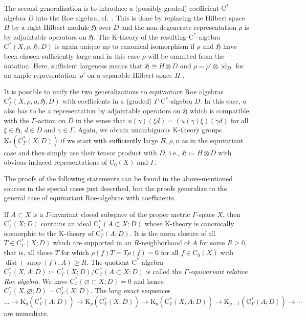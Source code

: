 \documentclass[pdftex]{sigma}
\numberwithin{equation}{section}
\theoremstyle{definition}
\newcommand{\Ct}{\mathrm{C}}
\newcommand{\Cz}{\Ct_0}
\newcommand{\HilbertMod}{\mathfrak{H}}
\DeclareMathOperator{\id}{id}
\DeclareMathOperator{\dist}{dist}
\DeclareMathOperator{\supp}{supp}
\newcommand{\K}{\mathrm{K}}
\newcommand{\textCstar}{\ensuremath{\mathrm{C}^*\!}}
\newcommand{\Roe}{\mathrm{C}^*}
\begin{document}
The second generalization is to introduce a (possibly graded) coefficient \textCstar-algebra $D$ into the Roe algebra, cf.\ \cite{HankePapeSchick,HigsonPedersenRoe,WulffTwisted}. This is done by replacing the Hilbert space $H$ by a right Hilbert module $\HilbertMod$ over $D$ and the non-degenerate representation $\rho$ is by adjointable operators on $\HilbertMod$.
The $\K$-theory of the resulting \textCstar-algebra $\Roe(X,\rho,\HilbertMod;D)$ is again unique up to canonical isomorphism if $\rho$ and $\HilbertMod$ have been chosen sufficiently large and in this case $\rho$ will be ommited from the notation. Here, sufficient largeness means that $\HilbertMod\cong H\otimes D$ and $\rho=\rho'\otimes \id_D$ for an ample representation~$\rho'$ on a separable Hilbert space $H$ \cite[Definition 4.5]{HigsonPedersenRoe}.


It is possible to unify the two generalizations to equivariant Roe algebras $\Roe_\Gamma(X,\rho,u,\HilbertMod;D)$ with coefficients in a (graded) $\Gamma$-\textCstar-algebra $D$.
In this case, $u$ also has to be a representation by adjointable operators on $\HilbertMod$ which is compatible with the $\Gamma$-action on $D$ in the sense that $u(\gamma)(\xi d)=(u(\gamma)\xi) (\gamma d)$ for all $\xi\in\HilbertMod$, $d\in D$ and $\gamma\in\Gamma$.
Again, we obtain unambiguous $\K$-theory groups $\K_*(\Roe_\Gamma(X;D))$ if we start with sufficiently large $H,\rho,u$ as in the equivariant case and then simply use their tensor product with $D$, i.e., $\HilbertMod\coloneqq H\otimes D$ with obvious induced representations of $\Cz(X)$ and $\Gamma$.




The proofs of the following statements can be found in the above-mentioned sources in the special cases just described, but the proofs generalize to the general case of equivariant Roe-algebras with coefficients.

If $A\subset X$ is a $\Gamma$-invariant closed subspace of the proper metric $\Gamma$-space $X$, then $\Roe_\Gamma(X;D)$ contains an ideal $\Roe_\Gamma(A\subset X;D)$ whose $\K$-theory is canonically isomorphic to the $\K$-theory of $\Roe_\Gamma(A;D)$.
It is the norm closure of all $T\in\Roe_\Gamma(X;D)$ which are supported in an $R$-neighborhood of $A$ for some $R\geq 0$, that is, all those $T$ for which $\rho(f)T=T\rho(f)=0$ for all $f\in\Cz(X)$ with $\dist(\supp(f),A)\geq R$.
The quotient \textCstar-algebra $\Roe_\Gamma(X,A;D)\coloneqq \Roe_\Gamma(X;D)/\Roe_\Gamma(A\subset X;D)$ is called the \emph{$\Gamma$-equivariant relative Roe algebra}. We have $\Roe_\Gamma(\varnothing\subset X;D)=0$ and hence $\Roe_\Gamma(X,\varnothing;D)=\Roe_\Gamma(X;D)$. The long exact sequences
\[
\dots\to\K_p(\Roe_\Gamma(A;D))\to \K_p(\Roe_\Gamma(X;D))\to \K_p(\Roe_\Gamma(X,A;D))\to \K_{p-1}(\Roe_\Gamma(A;D))\to \cdots
\]
are immediate.
\end{document}

